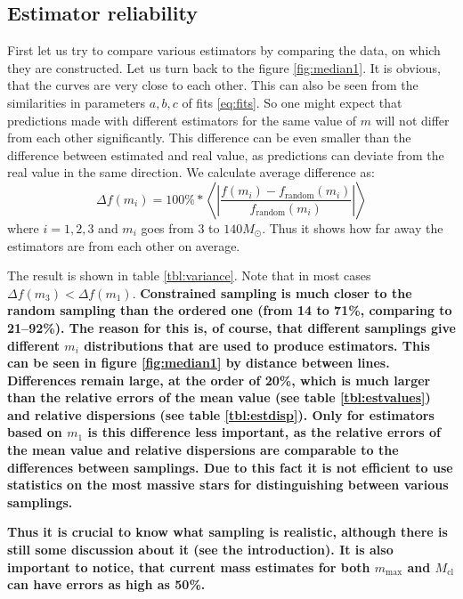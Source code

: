 \documentclass{aastex}
\newcommand{\MSun}{M_\odot}
\newcommand{\Mmax}{m_{\mathrm{max}}}
\newcommand{\Mcl}{M_{\mathrm{cl}}}
\begin{document}
\subsection{Estimator reliability}

First let us try to compare various estimators by comparing the data, on which they are constructed. Let us turn back to the figure \ref{fig:median1}. It is obvious, that the curves are very close to each other. This can also be seen from the similarities in parameters $a, b, c$ of fits \ref{eq:fits}. So one might expect that predictions made with different estimators for the same value of $m$ will not differ from each other significantly. This difference can be even smaller than the difference between estimated and real value, as predictions can deviate from the real value in the same direction.
We calculate average difference as:
\begin{equation}
  \Delta f(m_i) = 100\%*\left< \left| \frac{f(m_i) - f_\mathrm{random}(m_i)}{f_\mathrm{random}(m_i)}\right| \right> \label{eq:difference}
\end{equation} 
where $i = 1,2,3$ and $m_i$ goes from $3$ to $140 \MSun$. Thus it shows how far away the estimators are from each other on average.

The result is shown in table \ref{tbl:variance}. Note that in most cases $\Delta f(m_3) < \Delta f(m_1)$. 
\textbf{Constrained sampling is much closer to the random sampling than the ordered one (from 14 to 71\%, comparing to 21--92\%). 
The reason for this is, of course, that different samplings give different $m_i$ distributions that are used to produce estimators. This can be seen in figure \ref{fig:median1} by distance between lines. 
Differences remain large, at the order of 20\%, which is much larger than the relative errors of the mean value (see table \ref{tbl:estvalues}) and relative dispersions (see table \ref{tbl:estdisp}). Only for estimators based on $m_1$ is this difference less important, as the relative errors of the mean value and relative dispersions are comparable to the differences between samplings. 
Due to this fact it is not efficient to use statistics on the most massive stars for distinguishing between various samplings.}

\textbf{Thus it is crucial to know what sampling is realistic, although there is still some discussion about it (see the introduction).
It is also important to notice, that current mass estimates for both $\Mmax$ and $\Mcl$ can have errors as high as 50\%.}
\end{document}
